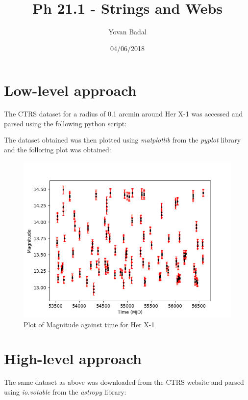 \documentclass[11pt]{article}
\begin{document}
	\title{Ph 21.1 - Strings and Webs}
	\author{Yovan Badal}
	\date{04/06/2018}
	\maketitle
	
\section{Low-level approach}
The CTRS dataset for a radius of 0.1 arcmin around Her X-1 was accessed and parsed using the following python script:


The dataset obtained was then plotted using \textit{matplotlib} from the \textit{pyplot} library and the folloring plot was obtained:
\begin{figure}[htp]
\centering
\includegraphics[scale=0.90]{Plot_1_1.png}
\caption{Plot of Magnitude against time for Her X-1}
\label{plot_lowlevel}
\end{figure}

\newpage
\section{High-level approach}
The same dataset as above was downloaded from the CTRS website and parsed using \textit{io.votable} from the \textit{astropy} library:

\end{document}
